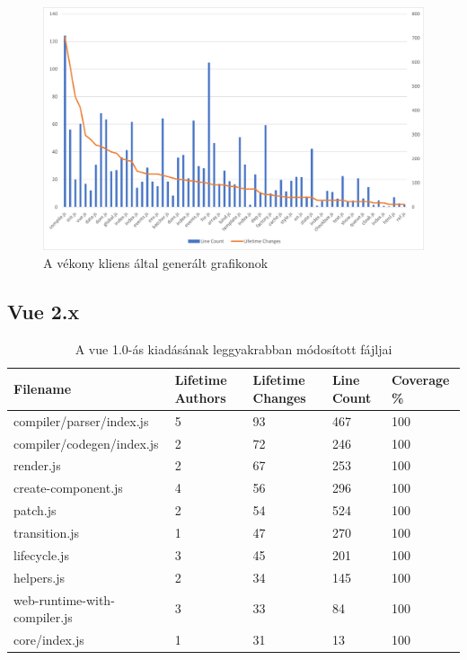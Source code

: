 \begin{figure}[H]
    \centering
    \includegraphics[width=1\textwidth]{images/vue/vue1-lines-lifetimechanges.png}
    \caption{A vékony kliens által generált grafikonok}
    \label{fig:hestia-charts}
\end{figure}

\pagebreak

\subsection{Vue 2.x}

\begin{table}[h]
    \hspace*{-1cm}\begin{tabular}{l|l|l|l|l}
        Filename                     & Lifetime Authors & Lifetime Changes & Line Count & Coverage \% \\ \hline
        compiler/parser/index.js     & 5                & 93               & 467        & 100         \\
        compiler/codegen/index.js    & 2                & 72               & 246        & 100         \\
        render.js                    & 2                & 67               & 253        & 100         \\
        create-component.js          & 4                & 56               & 296        & 100         \\
        patch.js                     & 2                & 54               & 524        & 100         \\
        transition.js                & 1                & 47               & 270        & 100         \\
        lifecycle.js                 & 3                & 45               & 201        & 100         \\
        helpers.js                   & 2                & 34               & 145        & 100         \\
        web-runtime-with-compiler.js & 3                & 33               & 84         & 100         \\
        core/index.js                & 1                & 31               & 13         & 100
    \end{tabular}
    \caption{A vue 1.0-ás kiadásának leggyakrabban módosított fájljai} \label{table:vue2-top-files}
\end{table}

